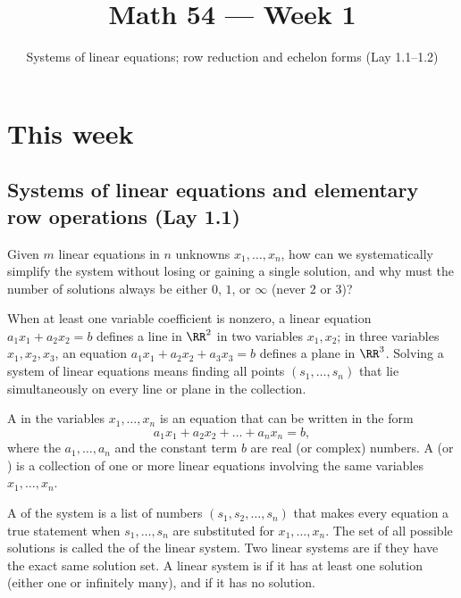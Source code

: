 \documentclass[10pt]{scrartcl}
\title{Math 54 --- Week 1}
\subtitle{Systems of linear equations; row reduction and echelon forms (Lay 1.1--1.2)}
\author{}\date{}\ihead{}
\begin{document}
\maketitle

\section{This week}

\subsection{Systems of linear equations and elementary row operations (Lay 1.1)}

\begin{qbox}
  Given $m$ linear equations in $n$ unknowns $x_1,\dots,x_n$, how can we systematically simplify the system without losing or gaining a single solution, and why must the number of solutions always be either $0$, $1$, or $\infty$ (never $2$ or $3$)?
\end{qbox}

When at least one variable coefficient is nonzero, a linear equation $a_1x_1+a_2x_2=b$ defines a line in $\RR^2$ in two variables $x_1,x_2$; in three variables $x_1,x_2,x_3$, an equation $a_1x_1+a_2x_2+a_3x_3=b$ defines a plane in $\RR^3$. Solving a system of linear equations means finding all points $(s_1,\dots,s_n)$ that lie simultaneously on every line or plane in the collection.

\begin{definition*}
  A  in the variables $x_1,\dots,x_n$ is an equation that can be written in the form
  \[
    a_1x_1 + a_2x_2 + \dots + a_nx_n = b,
  \]
  where the  $a_1,\dots,a_n$ and the constant term $b$ are real (or complex) numbers. A  (or ) is a collection of one or more linear equations involving the same variables $x_1,\dots,x_n$.
  \begin{itemize}
    \ii A  of the system is a list of numbers $(s_1,s_2,\dots,s_n)$ that makes every equation a true statement when $s_1,\dots,s_n$ are substituted for $x_1,\dots,x_n$.
    \ii The set of all possible solutions is called the  of the linear system. Two linear systems are  if they have the exact same solution set.
    \ii A linear system is  if it has at least one solution (either one or infinitely many), and  if it has no solution.
  \end{itemize}
\end{definition*}
\end{document}

